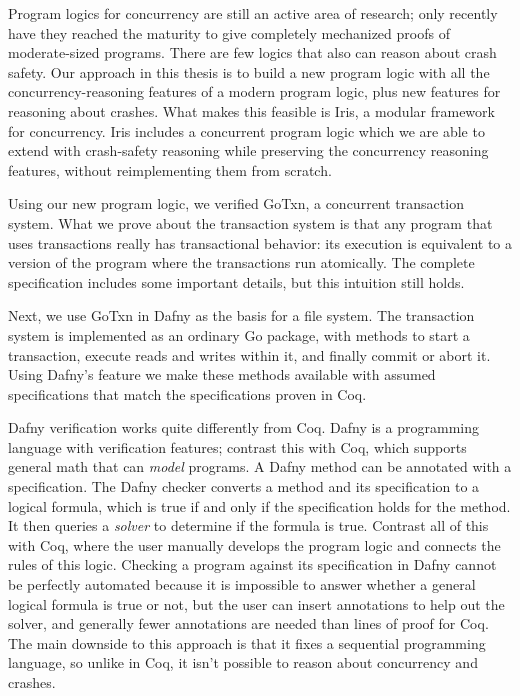 Program logics for concurrency are still an active area of research; only
recently have they reached the maturity to give completely mechanized proofs of
moderate-sized programs. There are few logics that also can reason about crash
safety. Our approach in this thesis is to build a new program logic with all the
concurrency-reasoning features of a modern program logic, plus new features for
reasoning about crashes. What makes this feasible is Iris, a modular framework
for concurrency. Iris includes a concurrent program logic which we are able to
extend with crash-safety reasoning while preserving the concurrency reasoning
features, without reimplementing them from scratch.

Using our new program logic, we verified GoTxn, a concurrent transaction system.
What we prove about the transaction system is that any program that uses
transactions really has transactional behavior: its execution is equivalent to a
version of the program where the transactions run atomically. The complete
specification includes some important details, but this intuition still holds.

Next, we use GoTxn in Dafny as the basis for a file system.
The transaction system is implemented as an ordinary Go package, with methods to
start a transaction, execute reads and writes within it, and finally commit or
abort it. Using Dafny's  feature we make these methods available with
assumed specifications that match the specifications proven in Coq.

Dafny verification works quite differently from Coq. Dafny is a programming
language with verification features; contrast this with Coq, which supports
general math that can \emph{model} programs. A Dafny method can be annotated
with a specification. The Dafny checker converts a method and its specification
to a logical formula, which is true if and only if the specification holds for
the method. It then queries a \emph{solver} to determine if the formula is true.
Contrast all of this with Coq, where the user manually develops the program
logic and connects the rules of this logic. Checking a program against its specification in Dafny cannot be perfectly
automated because it is impossible to answer whether a general logical formula
is true or not, but the user can insert annotations to help out the solver, and
generally fewer annotations are needed than lines of proof for Coq. The main
downside to this approach is that it fixes a sequential programming language, so
unlike in Coq, it isn't possible to reason about concurrency and crashes.

